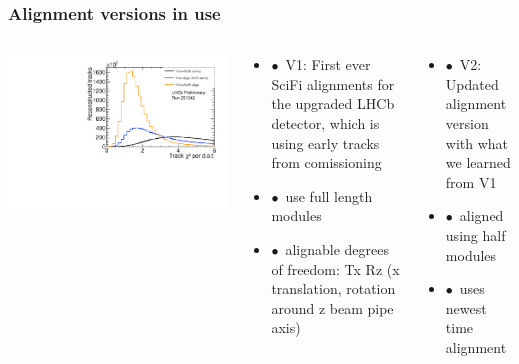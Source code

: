 \documentclass[aspectratio=1610, 12pt, xcolor=dvipsnames]{beamer}
\begin{document}
\begin{frame}\frametitle{Alignment versions in use}
  \begin{columns}
    \begin{column}[c]{0.33\textwidth}
      \centering
      \includegraphics[width=\textwidth]{logos/LHCb-FIGURE-2022-018/Run251342Preliminary_BestLong_chi2_per_ndof.pdf}
    \end{column}
    \begin{column}[c]{0.33\textwidth}
      \begin{itemize}
        \item $\bullet$\, V1: First ever SciFi alignments for the upgraded LHCb detector, which is using early tracks from comissioning
        \item $\bullet$\, use full length modules
        \item $\bullet$\, alignable degrees of freedom: Tx Rz (x translation, rotation around z \to beam pipe axis)
      \end{itemize}
    \end{column}
    \begin{column}[c]{0.33\textwidth}
      \begin{itemize}
        \item $\bullet$\, V2: Updated alignment version with what we learned from V1 %
        \item $\bullet$\, aligned using half modules
        \item $\bullet$\, uses newest time alignment
      \end{itemize}
    \end{column}
  \end{columns}
\end{frame}
\end{document}

